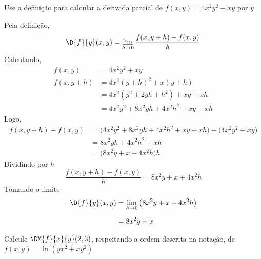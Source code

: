 \documentclass[a4paper,12pt,fleqn]{article}
\begin{document}

Use a definição para calcular a derivada parcial de
\(
  f(x, y) = 4x^2y^2 + xy
\)
por $y$

\begin{answer}
Pela definição,
\[
  \D{f}{y}(x, y) = \lim_{h \to 0} \frac{f(x,y+h) - f(x, y)}{h}
\]
Calculando,
\begin{align*}
  f(x, y)
  & = 4x^2y^2 + xy
  \\
  f(x, y+h)
  & = 4x^2(y+h)^2 + x(y+h) \\[2mm]
  & = 4x^2(y^2 + 2yh + h^2) + xy + xh \\[2mm]
  & = 4x^2y^2 + 8x^2yh + 4x^2h^2 + xy + xh
\end{align*}
Logo,
\begin{align*}
  f(x, y+h) - f(x, y)
  & = \big(4x^2y^2 + 8x^2yh + 4x^2h^2 + xy + xh\big) - \big(4x^2y^2 + xy\big) \\[2mm]
  & = 8x^2yh + 4x^2h^2 + xh \\[2mm]
  & = \big(8x^2y + x + 4x^2h\big)h
\end{align*}
Dividindo por $h$
\[
  \frac{f(x, y+h) - f(x, y)}{h}
    = 8x^2y + x + 4x^2h
\]
Tomando o limite
\begin{align*}
  \D{f}{y}(x, y)
  & = \lim_{h \to 0} \big(8x^2y + x + 4x^2h\big) \\[2mm]
  & = 8x^2y + x
\end{align*}
\end{answer}

Calcule \(\DM{f}{x}{y}(2, 3)\)\!, respeitando a ordem descrita na notação, de
\(
  f(x, y) = \ln\left(yx^2 + xy^2\right)
\)
\end{document}
